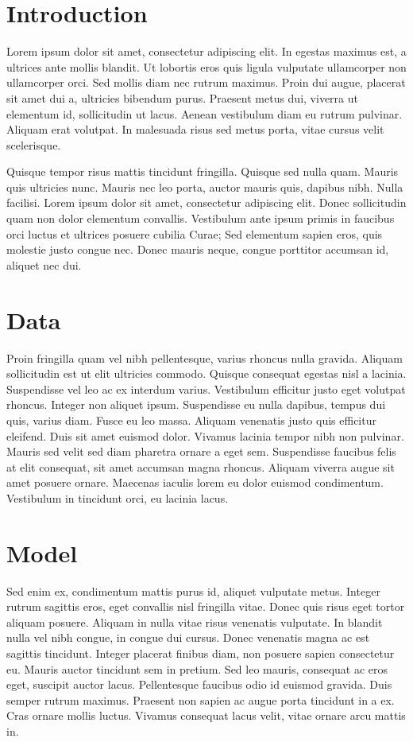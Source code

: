 
\section{Introduction}

Lorem ipsum dolor sit amet, consectetur adipiscing elit. In egestas maximus est, a ultrices ante mollis blandit. Ut lobortis eros quis ligula vulputate ullamcorper non ullamcorper orci. Sed mollis diam nec rutrum maximus. Proin dui augue, placerat sit amet dui a, ultricies bibendum purus. Praesent metus dui, viverra ut elementum id, sollicitudin ut lacus. Aenean vestibulum diam eu rutrum pulvinar. Aliquam erat volutpat. In malesuada risus sed metus porta, vitae cursus velit scelerisque.

Quisque tempor risus mattis tincidunt fringilla. Quisque sed nulla quam. Mauris quis ultricies nunc. Mauris nec leo porta, auctor mauris quis, dapibus nibh. Nulla facilisi. Lorem ipsum dolor sit amet, consectetur adipiscing elit. Donec sollicitudin quam non dolor elementum convallis. Vestibulum ante ipsum primis in faucibus orci luctus et ultrices posuere cubilia Curae; Sed elementum sapien eros, quis molestie justo congue nec. Donec mauris neque, congue porttitor accumsan id, aliquet nec dui.

\section{Data}

Proin fringilla quam vel nibh pellentesque, varius rhoncus nulla gravida. Aliquam sollicitudin est ut elit ultricies commodo. Quisque consequat egestas nisl a lacinia. Suspendisse vel leo ac ex interdum varius. Vestibulum efficitur justo eget volutpat rhoncus. Integer non aliquet ipsum. Suspendisse eu nulla dapibus, tempus dui quis, varius diam. Fusce eu leo massa. Aliquam venenatis justo quis efficitur eleifend. Duis sit amet euismod dolor. Vivamus lacinia tempor nibh non pulvinar. Mauris sed velit sed diam pharetra ornare a eget sem. Suspendisse faucibus felis at elit consequat, sit amet accumsan magna rhoncus. Aliquam viverra augue sit amet posuere ornare. Maecenas iaculis lorem eu dolor euismod condimentum. Vestibulum in tincidunt orci, eu lacinia lacus.

\section{Model}

Sed enim ex, condimentum mattis purus id, aliquet vulputate metus. Integer rutrum sagittis eros, eget convallis nisl fringilla vitae. Donec quis risus eget tortor aliquam posuere. Aliquam in nulla vitae risus venenatis vulputate. In blandit nulla vel nibh congue, in congue dui cursus. Donec venenatis magna ac est sagittis tincidunt. Integer placerat finibus diam, non posuere sapien consectetur eu. Mauris auctor tincidunt sem in pretium. Sed leo mauris, consequat ac eros eget, suscipit auctor lacus. Pellentesque faucibus odio id euismod gravida. Duis semper rutrum maximus. Praesent non sapien ac augue porta tincidunt in a ex. Cras ornare mollis luctus. Vivamus consequat lacus velit, vitae ornare arcu mattis in.

